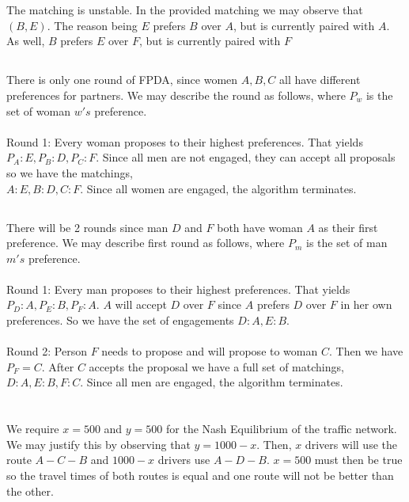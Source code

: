 \documentclass[12pt]{article}
\begin{document}
\newpage
\section{}
\subsection{}
The matching is unstable. In the provided matching we may observe that $(B, E)$. The reason being $E$ prefers $B$ over $A$, but is currently paired with $A$. As well, $B$ prefers $E$ over $F$, but is currently paired with $F$

\subsection{}
There is only one round of FPDA, since women $A, B, C$ all have different preferences for partners. We may describe the round as follows, where $P_w$ is the set of woman $w's$ preference. 
\\
\\
Round 1: Every woman proposes to their highest preferences. That yields $P_A : E, P_B : D, P_C : F$. Since all men are not engaged, they can accept all proposals so we have the matchings, \\ $A : E, B : D, C : F$. Since all women are engaged, the algorithm terminates. 
\subsection{}
There will be 2 rounds since man $D$ and $F$ both have woman $A$ as their first preference. We may describe first round as follows, where $P_m$ is the set of man $m's$ preference.
\\
\\
Round 1: Every man proposes to their highest preferences. That yields $P_D : A, P_E : B, P_F : A$. $A$ will accept $D$ over $F$ since $A$ prefers $D$ over $F$ in her own preferences. So we have the set of engagements $D : A, E : B$. 
\\
\\
Round 2: Person $F$ needs to propose and will propose to woman $C$. Then we have $P_F = C$. After $C$ accepts the proposal we have a full set of matchings, $D:A, E:B, F:C$. Since all men are engaged, the algorithm terminates. 

\newpage
\section{}
\subsection{}
We require $x = 500$ and $y = 500$ for the Nash Equilibrium of the traffic network. We may justify this by observing that $y = 1000 - x$. Then, $x$ drivers will use the route $A-C-B$ and $1000 - x$ drivers use $A-D-B$. $x = 500$ must then be true so the  travel times of both routes is equal and one route will not be better than the other. 
\end{document}

